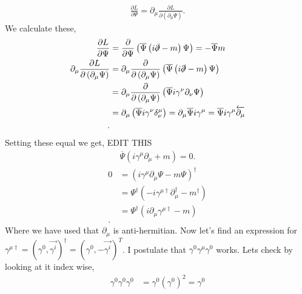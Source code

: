 \documentclass[working, oneside]{../../../Preambles/tuftebook}
\begin{document}
\begin{solution}
\begin{align*}
    \frac{\partial L}{\partial \Psi} = \partial_{\mu }\frac{\partial L}{\partial \left( \partial_{\mu }\Psi \right) }
.\end{align*}
We calculate these, 
\begin{align*}
    \frac{\partial L}{\partial \Psi} &= \frac{\partial}{\partial \Psi} \left( \overline{\Psi} \left( i\slashed \partial - m \right) \Psi \right) = -\overline{\Psi}m\\
\partial_{\mu }\frac{\partial L}{\partial \left( \partial_{\mu }\Psi \right) } &= \partial_{\mu }\frac{\partial }{\partial \left( \partial_{\mu }\Psi \right) }  \left( \overline{\Psi} \left( i\slashed \partial - m \right) \Psi \right)\\
                                                                               &= \partial_{\mu }\frac{\partial }{\partial \left( \partial_{\mu }\Psi \right) }  \left( \overline{\Psi}i\gamma^{\nu } \partial_{\nu } \Psi \right)\\
                                                                               &= \partial_{\mu } \left( \overline{\Psi}i\gamma^{\nu } \delta^{\mu }_{\nu} \right) = \partial_{\mu }\overline{\Psi}i\gamma^{\mu } = \overline{\Psi} i \gamma^{\mu }\overleftarrow{\partial_{\mu }} \\
.\end{align*}
Setting these equal we get,
\hline
EDIT THIS
\begin{align*}
    \overline{\Psi}\left( i \gamma^{\mu }\partial_{\mu } + m \right) = 0
.\end{align*}
\begin{align*}
0&= \left(   i\gamma^{\mu }\partial_{\mu }\Psi - m\Psi \right)^\dagger \\
 &= \Psi^\dagger\left( -i\gamma^{\mu \dagger} \partial_{\mu}^\dagger - m^\dagger\right)\\
 &= \Psi^\dagger\left( i\partial_{\mu }\gamma^{\mu \dagger} - m\right)\\
.\end{align*}
Where we have used that $\partial_\mu $ is anti-hermitian. Now let's find an expression for $\gamma^{\mu \dagger} = \left( \gamma^{0}, \vec{\gamma^{i}} \right)^{\dagger} = \left( \gamma^{0}, - \vec{\gamma^{i}} \right)^{T}  $. I postulate that $\gamma^{0}\gamma^{\mu }\gamma^{0}$ works. Lets check by looking at it index wise,
\begin{align*}
    \gamma^{0}\gamma^{0}\gamma^{0} &= \gamma^{0}\left( \gamma^{0} \right) ^2 = \gamma^{0} \\

\end{align*}
\end{solution}
\end{document}

